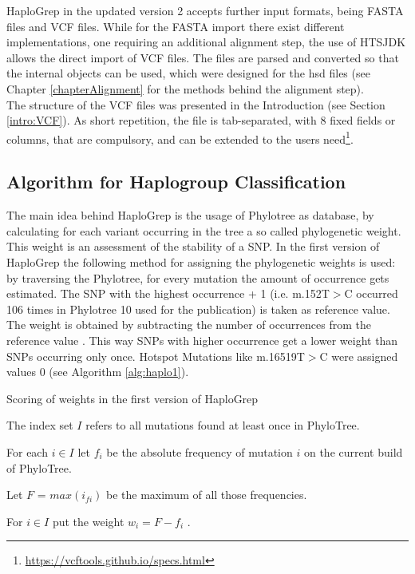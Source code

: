 HaploGrep in the updated version 2 accepts further input formats, being FASTA files and VCF files. While for the FASTA import there exist different implementations, one requiring an additional alignment step, the use of HTSJDK allows the direct import of VCF files. The files are parsed and converted so that the internal objects can be used, which were designed for the hsd files (see Chapter \ref{chapterAlignment} for the methods behind the alignment step). 
\\
The structure of the VCF files was presented in the Introduction (see Section \ref{intro:VCF}). As short repetition, the file is tab-separated, with 8 fixed fields or columns, that are compulsory, and can be extended to the users need\footnote{\url{https://vcftools.github.io/specs.html}}.

\subsection{Algorithm for Haplogroup Classification}\label{hg:algorithm}
The main idea behind HaploGrep is the usage of Phylotree as database, by calculating for each variant occurring in the tree a so called phylogenetic weight. This weight is an assessment of the stability of a SNP. In the first version of HaploGrep the following method for assigning the phylogenetic weights is used: by traversing the Phylotree, for every mutation the amount of occurrence gets estimated. The SNP with the highest occurrence + 1 (i.e. m.152T$>$C occurred 106 times in Phylotree 10 used for the publication) is taken as reference value. The weight is obtained by subtracting the number of occurrences from the reference value \cite{Kloss-Brandstatter2011}. This way SNPs with higher occurrence get a lower weight than SNPs occurring only once. Hotspot Mutations like m.16519T$>$C were assigned values 0 (see Algorithm \ref{alg:haplo1}).

\begin{algorithm}
\caption{Scoring of weights in the first version of HaploGrep}
\label{alg:haplo1}
The index set $I$ refers to all mutations found at least once in PhyloTree. 

For each $i \in I$ let $f_i$ be the absolute frequency of mutation $i$ on the current build of PhyloTree. 

Let $F$ = $max(i_{fi})$ be the maximum of all those frequencies. 

For $i \in I$ put the weight $w_i = F-f_i$ \cite{Kloss-Brandstatter2011}. 
\end{algorithm}

